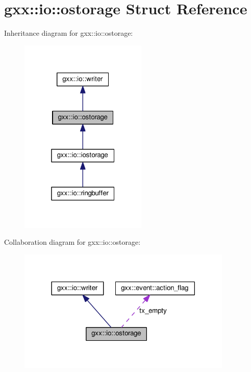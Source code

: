\hypertarget{structgxx_1_1io_1_1ostorage}{}\section{gxx\+:\+:io\+:\+:ostorage Struct Reference}
\label{structgxx_1_1io_1_1ostorage}


Inheritance diagram for gxx\+:\+:io\+:\+:ostorage\+:
\nopagebreak
\begin{figure}[H]
\begin{center}
\leavevmode
\includegraphics[width=172pt]{structgxx_1_1io_1_1ostorage__inherit__graph}
\end{center}
\end{figure}


Collaboration diagram for gxx\+:\+:io\+:\+:ostorage\+:
\nopagebreak
\begin{figure}[H]
\begin{center}
\leavevmode
\includegraphics[width=290pt]{structgxx_1_1io_1_1ostorage__coll__graph}
\end{center}
\end{figure}
